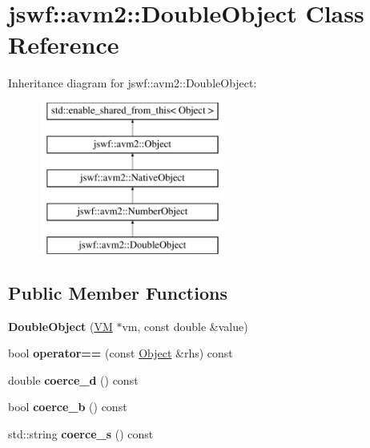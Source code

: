 \hypertarget{classjswf_1_1avm2_1_1_double_object}{\section{jswf\+:\+:avm2\+:\+:Double\+Object Class Reference}
\label{classjswf_1_1avm2_1_1_double_object}
}
Inheritance diagram for jswf\+:\+:avm2\+:\+:Double\+Object\+:\begin{figure}[H]
\begin{center}
\leavevmode
\includegraphics[height=5.000000cm]{classjswf_1_1avm2_1_1_double_object}
\end{center}
\end{figure}
\subsection*{Public Member Functions}
\begin{DoxyCompactItemize}
\item 
\hypertarget{classjswf_1_1avm2_1_1_double_object_a1778eb5e71827fab8a0b76b43ce5b10e}{{\bfseries Double\+Object} (\hyperlink{classjswf_1_1avm2_1_1_v_m}{V\+M} $\ast$vm, const double \&value)}\label{classjswf_1_1avm2_1_1_double_object_a1778eb5e71827fab8a0b76b43ce5b10e}

\item 
\hypertarget{classjswf_1_1avm2_1_1_double_object_ad4cfde01e6a195882ab26d5ad1be995e}{bool {\bfseries operator==} (const \hyperlink{classjswf_1_1avm2_1_1_object}{Object} \&rhs) const }\label{classjswf_1_1avm2_1_1_double_object_ad4cfde01e6a195882ab26d5ad1be995e}

\item 
\hypertarget{classjswf_1_1avm2_1_1_double_object_a92f4dbc13ee3a9b24aae970313a6ea80}{double {\bfseries coerce\+\_\+d} () const }\label{classjswf_1_1avm2_1_1_double_object_a92f4dbc13ee3a9b24aae970313a6ea80}

\item 
\hypertarget{classjswf_1_1avm2_1_1_double_object_a99fa358b01188804f0f728fd2fcd330d}{bool {\bfseries coerce\+\_\+b} () const }\label{classjswf_1_1avm2_1_1_double_object_a99fa358b01188804f0f728fd2fcd330d}

\item 
\hypertarget{classjswf_1_1avm2_1_1_double_object_aff3c7e2a0979215bf37c3a1fca42fd65}{std\+::string {\bfseries coerce\+\_\+s} () const }\label{classjswf_1_1avm2_1_1_double_object_aff3c7e2a0979215bf37c3a1fca42fd65}

\end{DoxyCompactItemize}
